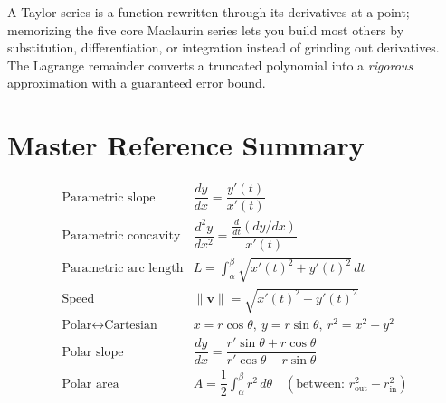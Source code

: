 \documentclass[11pt]{article}
\begin{document}
\begin{conceptbox}
A Taylor series is a function rewritten through its \textcolor{accentorange}{derivatives
at a point}; memorizing the five core Maclaurin series lets you build most others by
\textcolor{accentorange}{substitution, differentiation, or integration} instead of
grinding out derivatives. The \textcolor{accentorange}{Lagrange remainder} converts a
truncated polynomial into a \emph{rigorous} approximation with a guaranteed error
bound.
\end{conceptbox}

\clearpage
{}
{}
\section*{Master Reference Summary}

\begin{formulabox}
\renewcommand{\arraystretch}{1.7}
\[
\begin{array}{ll}
\text{Parametric slope} & \dfrac{dy}{dx} = \dfrac{y'(t)}{x'(t)} \\
\text{Parametric concavity} & \dfrac{d^2y}{dx^2} = \dfrac{\frac{d}{dt}(dy/dx)}{x'(t)} \\
\text{Parametric arc length} & L = \displaystyle\int_\alpha^\beta \sqrt{x'(t)^2+y'(t)^2}\,dt \\
\text{Speed} & \|\mathbf{v}\| = \sqrt{x'(t)^2+y'(t)^2} \\
\text{Polar} \leftrightarrow \text{Cartesian} & x=r\cos\theta,\ y=r\sin\theta,\ r^2=x^2+y^2 \\
\text{Polar slope} & \dfrac{dy}{dx} = \dfrac{r'\sin\theta+r\cos\theta}{r'\cos\theta-r\sin\theta} \\
\text{Polar area} & A=\dfrac12\displaystyle\int_\alpha^\beta r^2\,d\theta \quad(\text{between: } r_{\text{out}}^2-r_{\text{in}}^2)\\
\end{array}
\]
\end{formulabox}
\end{document}
